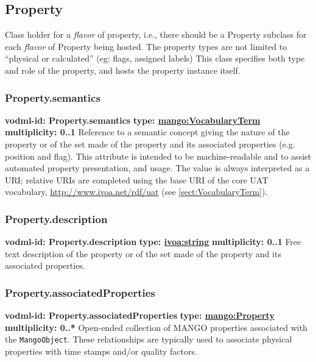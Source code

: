   \subsection{Property}
    \label{sect:Property}
    Class holder for a \textit{flavor} of property, i.e., there should be a Property subclass for each \textit{flavor} of Property being hosted. The property types are not limited to “physical or calculated” (eg: flags, assigned labels) This class specifies both type and role of the property, and hosts the property instance itself.

    \subsubsection{Property.semantics}
    \textbf{vodml-id: Property.semantics} \newline
    \textbf{type: \hyperref[sect:VocabularyTerm]{mango:VocabularyTerm}} \newline
    \textbf{multiplicity: 0..1} \newline
    Reference to a semantic concept giving the nature of the property or of the set made of the property and its associated properties (e.g. position and flag). This attribute is intended to be machine-readable and to assist automated property presentation, and usage. The value is always interpreted as a URI; relative URIs are completed using the base URI of the core UAT vocabulary, \url{http://www.ivoa.net/rdf/uat} (see \ref{sect:VocabularyTerm}).

    \subsubsection{Property.description}
    \textbf{vodml-id: Property.description} \newline
    \textbf{type: \hyperref[sect:ivoa]{ivoa:string}} \newline
    \textbf{multiplicity: 0..1} \newline
    Free text description of the property or of the set made of the property and its associated properties.

    \subsubsection{Property.associatedProperties}
    \textbf{vodml-id: Property.associatedProperties} \newline
    \textbf{type: \hyperref[sect:Property]{mango:Property}} \newline
    \textbf{multiplicity: 0..*} \newline
    Open-ended collection of MANGO properties associated with the \texttt{MangoObject}. These relationships are typically used to associate physical properties with time stamps and/or quality factors.

